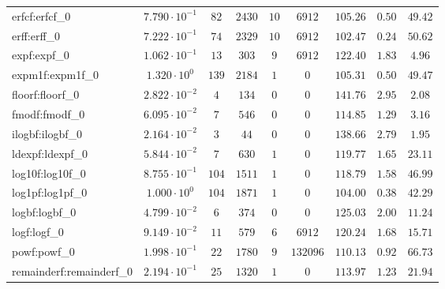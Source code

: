 \begin{tabular}{|l|c|c|c|c|c|c|c|c|}
erfcf:erfcf\_0               & $ 7.790 \cdot 10^{-1} $ & $ 82     $ & $ 2430  $ & $ 10  $ & $ 6912   $ & $ 105.26      $ & $ 0.50    $ & $ 49.42   $ \\
erff:erff\_0                 & $ 7.222 \cdot 10^{-1} $ & $ 74     $ & $ 2329  $ & $ 10  $ & $ 6912   $ & $ 102.47      $ & $ 0.24    $ & $ 50.62   $ \\
expf:expf\_0                 & $ 1.062 \cdot 10^{-1} $ & $ 13     $ & $ 303   $ & $ 9   $ & $ 6912   $ & $ 122.40      $ & $ 1.83    $ & $ 4.96    $ \\
expm1f:expm1f\_0             & $ 1.320 \cdot 10^{0}  $ & $ 139    $ & $ 2184  $ & $ 1   $ & $ 0      $ & $ 105.31      $ & $ 0.50    $ & $ 49.47   $ \\
floorf:floorf\_0             & $ 2.822 \cdot 10^{-2} $ & $ 4      $ & $ 134   $ & $ 0   $ & $ 0      $ & $ 141.76      $ & $ 2.95    $ & $ 2.08    $ \\
fmodf:fmodf\_0               & $ 6.095 \cdot 10^{-2} $ & $ 7      $ & $ 546   $ & $ 0   $ & $ 0      $ & $ 114.85      $ & $ 1.29    $ & $ 3.16    $ \\
ilogbf:ilogbf\_0             & $ 2.164 \cdot 10^{-2} $ & $ 3      $ & $ 44    $ & $ 0   $ & $ 0      $ & $ 138.66      $ & $ 2.79    $ & $ 1.95    $ \\
ldexpf:ldexpf\_0             & $ 5.844 \cdot 10^{-2} $ & $ 7      $ & $ 630   $ & $ 1   $ & $ 0      $ & $ 119.77      $ & $ 1.65    $ & $ 23.11   $ \\
log10f:log10f\_0             & $ 8.755 \cdot 10^{-1} $ & $ 104    $ & $ 1511  $ & $ 1   $ & $ 0      $ & $ 118.79      $ & $ 1.58    $ & $ 46.99   $ \\
log1pf:log1pf\_0             & $ 1.000 \cdot 10^{0}  $ & $ 104    $ & $ 1871  $ & $ 1   $ & $ 0      $ & $ 104.00      $ & $ 0.38    $ & $ 42.29   $ \\
logbf:logbf\_0               & $ 4.799 \cdot 10^{-2} $ & $ 6      $ & $ 374   $ & $ 0   $ & $ 0      $ & $ 125.03      $ & $ 2.00    $ & $ 11.24   $ \\
logf:logf\_0                 & $ 9.149 \cdot 10^{-2} $ & $ 11     $ & $ 579   $ & $ 6   $ & $ 6912   $ & $ 120.24      $ & $ 1.68    $ & $ 15.71   $ \\
powf:powf\_0                 & $ 1.998 \cdot 10^{-1} $ & $ 22     $ & $ 1780  $ & $ 9   $ & $ 132096 $ & $ 110.13      $ & $ 0.92    $ & $ 66.73   $ \\
remainderf:remainderf\_0     & $ 2.194 \cdot 10^{-1} $ & $ 25     $ & $ 1320  $ & $ 1   $ & $ 0      $ & $ 113.97      $ & $ 1.23    $ & $ 21.94   $ \\

\end{tabular}
